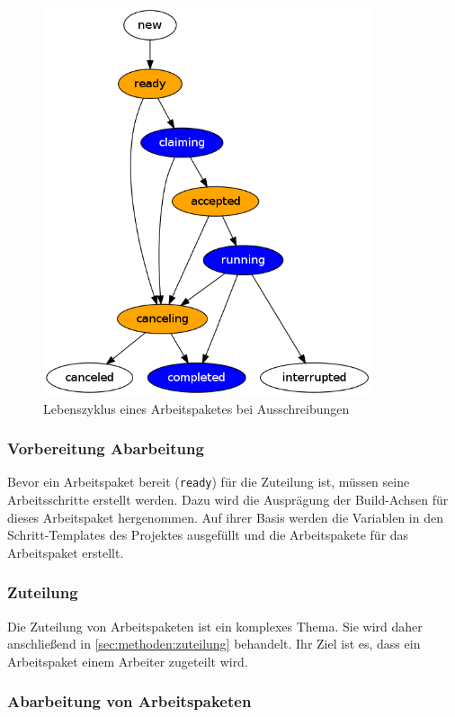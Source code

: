 \begin{figure}[ht] 
  \centering
  \includegraphics[height=4.5in]{imageinput/lebenszyklus-arbeitspaket.png}
  \caption{Lebenszyklus eines Arbeitspaketes bei Ausschreibungen}
  \label{fig:lebenszyklus-arbeitspaket}
\end{figure}


\subsubsection{Vorbereitung Abarbeitung}

Bevor ein Arbeitspaket bereit (\verb|ready|) für die Zuteilung ist,
müssen seine Arbeitsschritte erstellt werden.
Dazu wird die Ausprägung der Build-Achsen für dieses Arbeitspaket hergenommen.
Auf ihrer Basis werden die Variablen in den Schritt-Templates des Projektes
ausgefüllt und die Arbeitspakete für das Arbeitspaket erstellt. 

\subsubsection{Zuteilung}

Die Zuteilung von Arbeitspaketen ist ein komplexes Thema.
Sie wird daher anschließend in \cref{sec:methoden:zuteilung} behandelt.
Ihr Ziel ist es, dass ein Arbeitspaket einem Arbeiter zugeteilt wird.

\subsubsection{Abarbeitung von Arbeitspaketen}

